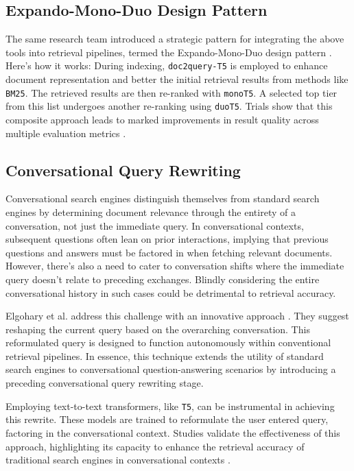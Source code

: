 \documentclass[sigconf]{acmart}
\begin{document}
\subsection*{Expando-Mono-Duo Design Pattern}\label{sec:expando}
The same research team introduced a strategic pattern for integrating the above tools into retrieval pipelines, termed the Expando-Mono-Duo design pattern \cite{pradeep2021expando}. Here's how it works: During indexing, \texttt{doc2query-T5} is employed to enhance document representation and better the initial retrieval results from methods like \texttt{BM25}. The retrieved results are then re-ranked with \texttt{monoT5}. A selected top tier from this list undergoes another re-ranking using \texttt{duoT5}. Trials show that this composite approach leads to marked improvements in result quality across multiple evaluation metrics \cite{pradeep2021expando}.

\subsection*{Conversational Query Rewriting}\label{sec:cqr}
Conversational search engines distinguish themselves from standard search engines by determining document relevance through the entirety of a conversation, not just the immediate query. In conversational contexts, subsequent questions often lean on prior interactions, implying that previous questions and answers must be factored in when fetching relevant documents. However, there's also a need to cater to conversation shifts where the immediate query doesn't relate to preceding exchanges. Blindly considering the entire conversational history in such cases could be detrimental to retrieval accuracy.

Elgohary et al. address this challenge with an innovative approach \cite{elgohary2019can}. They suggest reshaping the current query based on the overarching conversation. This reformulated query is designed to function autonomously within conventional retrieval pipelines. In essence, this technique extends the utility of standard search engines to conversational question-answering scenarios by introducing a preceding conversational query rewriting stage.

Employing text-to-text transformers, like \texttt{T5}, can be instrumental in achieving this rewrite. These models are trained to reformulate the user entered query, factoring in the conversational context. Studies validate the effectiveness of this approach, highlighting its capacity to enhance the retrieval accuracy of traditional search engines in conversational contexts \cite{elgohary2019can,anantha2020open,Lajewska:2023:ECIR}.
\end{document}
